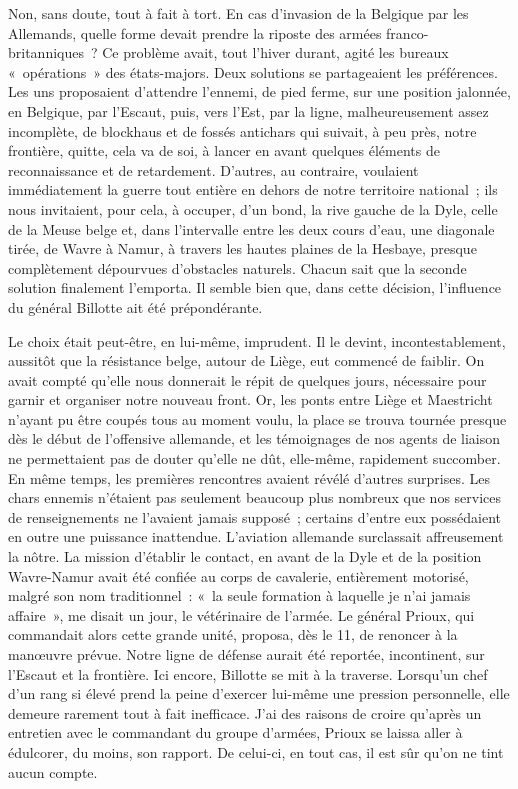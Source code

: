 \documentclass[french,twoside]{book} %
\begin{document}
Non, sans doute, tout à fait à tort. En cas d’invasion de la Belgique par les Allemands, quelle forme devait prendre la riposte des armées franco-britanniques ? Ce problème avait, tout l’hiver durant, agité les bureaux « opérations » des états-majors. Deux solutions se partageaient les préférences. Les uns proposaient d’attendre l’ennemi, de pied ferme, sur   une position jalonnée, en Belgique, par l’Escaut, puis, vers l’Est, par la ligne, malheureusement assez incomplète, de blockhaus et de fossés antichars qui suivait, à peu près, notre frontière, quitte, cela va de soi, à lancer en avant quelques éléments de reconnaissance et de retardement. D’autres, au contraire, voulaient immédiatement la guerre tout entière en dehors de notre territoire national ; ils nous invitaient, pour cela, à occuper, d’un bond, la rive gauche de la Dyle, celle de la Meuse belge et, dans l’intervalle entre les deux cours d’eau, une diagonale tirée, de Wavre à Namur, à travers les hautes plaines de la Hesbaye, presque complètement dépourvues d’obstacles naturels. Chacun sait que la seconde solution finalement l’emporta. Il semble bien que, dans cette décision, l’influence du général Billotte ait été prépondérante.\par
Le choix était peut-être, en lui-même, imprudent. Il le devint, incontestablement, aussitôt que la résistance belge, autour de Liège, eut commencé de faiblir. On avait compté qu’elle nous donnerait le répit de quelques jours, nécessaire pour garnir et organiser notre nouveau front. Or, les ponts entre Liège et Maestricht n’ayant pu être coupés tous au moment voulu, la place se trouva tournée presque dès le début de l’offensive allemande, et les témoignages de nos agents de liaison ne permettaient pas de douter qu’elle ne dût, elle-même, rapidement succomber. En même temps, les premières rencontres avaient révélé d’autres surprises. Les chars ennemis n’étaient pas seulement beaucoup plus nombreux que nos services de renseignements ne l’avaient jamais supposé ; certains d’entre eux possédaient en outre une puissance inattendue. L’aviation allemande surclassait affreusement la nôtre. La mission d’établir le contact, en avant de la Dyle et de la position Wavre-Namur avait été confiée au corps de cavalerie, entièrement motorisé, malgré son nom traditionnel : « la seule formation à laquelle je n’ai   jamais affaire », me disait un jour, le vétérinaire de l’armée. Le général Prioux, qui commandait alors cette grande unité, proposa, dès le 11, de renoncer à la manœuvre prévue. Notre ligne de défense aurait été reportée, incontinent, sur l’Escaut et la frontière. Ici encore, Billotte se mit à la traverse. Lorsqu’un chef d’un rang si élevé prend la peine d’exercer lui-même une pression personnelle, elle demeure rarement tout à fait inefficace. J’ai des raisons de croire qu’après un entretien avec le commandant du groupe d’armées, Prioux se laissa aller à édulcorer, du moins, son rapport. De celui-ci, en tout cas, il est sûr qu’on ne tint aucun compte.\par
\end{document}

